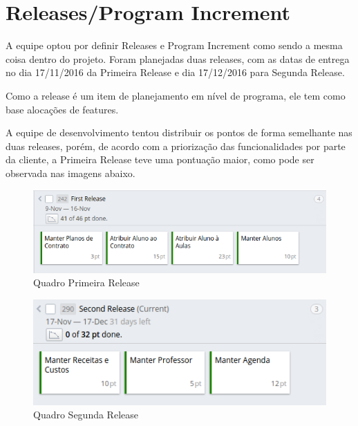 \section[Releases/Program Increment]{Releases/Program Increment}
A equipe optou por definir Releases e Program Increment como sendo a mesma coisa dentro do projeto. Foram planejadas duas releases, com as datas de entrega no dia 17/11/2016 da Primeira Release e dia 17/12/2016 para Segunda Release. 

Como a release é um item de planejamento em nível de programa, ele tem como base alocações de features. 

A equipe de desenvolvimento tentou distribuir os pontos de forma semelhante nas duas releases, porém, de acordo com a priorização das funcionalidades por parte da cliente, a Primeira Release teve uma pontuação maior, como pode ser observada nas imagens abaixo.

\begin{figure}[!htb]
    \centering
    \includegraphics[width=\textwidth]{figuras/release_1.png}
    \caption{Quadro Primeira Release}
    \label{fig:release_1}
\end{figure}

\begin{figure}[!htb]
    \centering
    \includegraphics[width=\textwidth]{figuras/release_2.png}
    \caption{Quadro Segunda Release}
    \label{fig:release_2}
\end{figure}